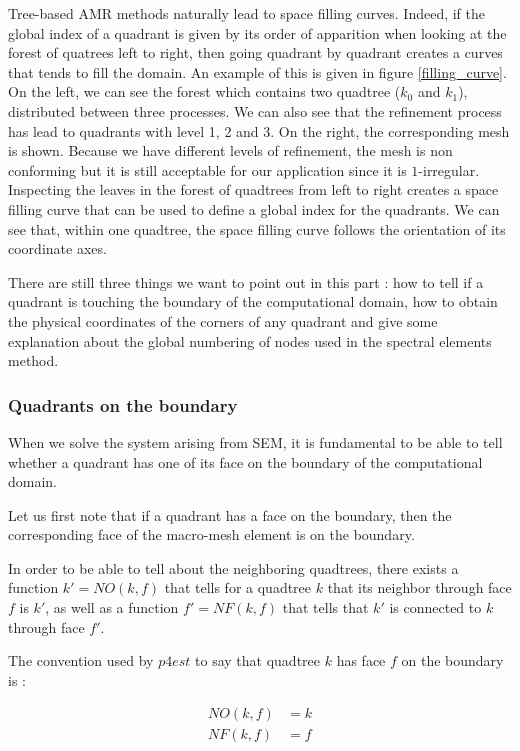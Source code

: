 Tree-based AMR methods naturally lead to space filling curves. Indeed, if the global index of a quadrant is given by its order of apparition when looking at the forest of quatrees left to right, then going quadrant by quadrant creates a curves that tends to fill the domain. An example of this is given in figure \ref{filling_curve}. On the left, we can see the forest which contains two quadtree ($k_0$ and $k_1$), distributed between three processes. We can also see that the refinement process has lead to quadrants with level 1, 2 and 3. On the right, the corresponding mesh is shown. Because we have different levels of refinement, the mesh is non conforming but it is still acceptable for our application since it is $1$-irregular. Inspecting the leaves in the forest of quadtrees from left to right creates a space filling curve that can be used to define a global index for the quadrants. We can see that, within one quadtree, the space filling curve follows the orientation of its coordinate axes.

There are still three things we want to point out in this part : how to tell if a quadrant is touching the boundary of the computational domain, how to obtain the physical coordinates of the corners of any quadrant and give some explanation about the global numbering of nodes used in the spectral elements method. 

\subsubsection{Quadrants on the boundary}

When we solve the system arising from SEM, it is fundamental to be able to tell whether a quadrant has one of its face on the boundary of the computational domain. 

Let us first note that if a quadrant has a face on the boundary, then the corresponding face of the macro-mesh element is on the boundary. 

In order to be able to tell about the neighboring quadtrees, there exists a function $k'=NO(k,f)$ that tells for a quadtree $k$ that its neighbor through face $f$ is $k'$, as well as a function $f' = NF(k,f)$ that tells that $k'$ is connected to $k$ through face $f'$. 

The convention used by $p4est$ to say that quadtree $k$ has face $f$ on the boundary is : 

\begin{align*}
NO(k,f) &= k\\
NF(k,f) &= f
\end{align*}

